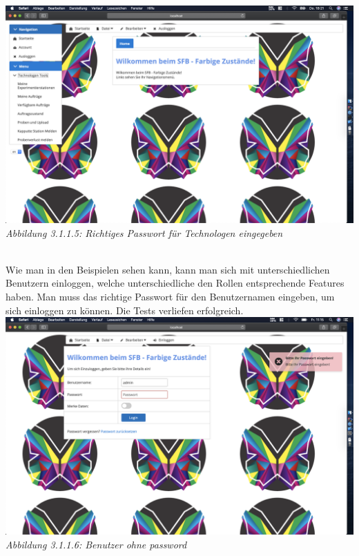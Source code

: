 \documentclass[enabledeprecatedfontcommands,fontsize=12pt,paper=a4,twoside]{scrartcl}
\begin{document}
\hypertarget{sc3.1.1.5}{
\includegraphics[width=1\textwidth]{Screenshots/311TechnologeView.png}
\textit{Abbildung 3.1.1.5: Richtiges Passwort für Technologen eingegeben}
} \\

Wie man in den Beispielen sehen kann, kann man sich mit unterschiedlichen Benutzern einloggen, welche unterschiedliche den Rollen entsprechende Features haben. Man muss das richtige Passwort für den Benutzernamen eingeben, um sich einloggen zu können. Die Tests verliefen erfolgreich. \\ 

\hypertarget{sc3.1.1.6}{
\includegraphics[width=1\textwidth]{Screenshots/311BittePasswordEingeben.png}\\ \textit{Abbildung 3.1.1.6: Benutzer ohne password}
} \\
\end{document}
